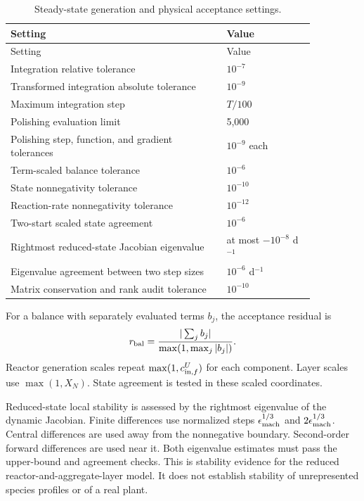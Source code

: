 \begin{longtable}{p{0.61\linewidth}p{0.25\linewidth}}
\caption{Steady-state generation and physical acceptance settings.}\label{tab:plant_generation_settings}\\
\toprule Setting & Value\\\midrule\endfirsthead
\toprule Setting & Value\\\midrule\endhead
Integration relative tolerance & $10^{-7}$\\
Transformed integration absolute tolerance & $10^{-9}$\\
Maximum integration step & $T/100$\\
Polishing evaluation limit & 5{,}000\\
Polishing step, function, and gradient tolerances & $10^{-9}$ each\\
Term-scaled balance tolerance & $10^{-6}$\\
State nonnegativity tolerance & $10^{-10}$\\
Reaction-rate nonnegativity tolerance & $10^{-12}$\\
Two-start scaled state agreement & $10^{-6}$\\
Rightmost reduced-state Jacobian eigenvalue & at most $-10^{-8}$ d$^{-1}$\\
Eigenvalue agreement between two step sizes & $10^{-6}$ d$^{-1}$\\
Matrix conservation and rank audit tolerance & $10^{-10}$\\
\bottomrule
\end{longtable}

For a balance with separately evaluated terms $b_j$, the acceptance residual is
\begin{equation}
r_{\rm bal}=\frac{|\sum_jb_j|}{\max(1,\max_j|b_j|)}.
\label{eq:plant_acceptance_balance}
\end{equation}
Reactor generation scales repeat $\max(1,c_{{\rm in},f}^U)$ for each component. Layer scales use $\max(1,X_N)$. State agreement is tested in these scaled coordinates.

Reduced-state local stability is assessed by the rightmost eigenvalue of the dynamic Jacobian. Finite differences use normalized steps $\epsilon_{\rm mach}^{1/3}$ and $2\epsilon_{\rm mach}^{1/3}$. Central differences are used away from the nonnegative boundary. Second-order forward differences are used near it. Both eigenvalue estimates must pass the upper-bound and agreement checks. This is stability evidence for the reduced reactor-and-aggregate-layer model. It does not establish stability of unrepresented species profiles or of a real plant.

